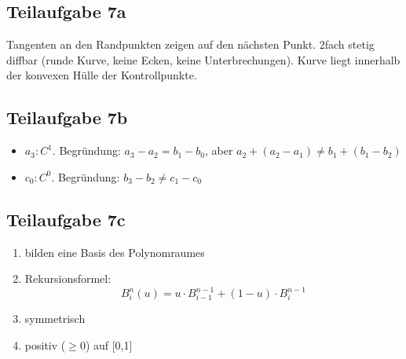 \documentclass[a4paper]{scrartcl}
\begin{document}
\subsection*{Teilaufgabe 7a}


Tangenten an den Randpunkten zeigen auf den nächsten Punkt. 2fach stetig diffbar (runde Kurve, keine Ecken, keine Unterbrechungen). Kurve liegt innerhalb der konvexen Hülle der Kontrollpunkte.

\subsection*{Teilaufgabe 7b}

\begin{itemize}
    \item $a_3: C^1$. Begründung: $a_3 - a_2 = b_1 - b_0$, aber $a_2 + (a_2-a_1) \neq b_1 + (b_1 - b_2)$
    \item $c_0: C^0$. Begründung: $b_3-b_2 \neq c_1 - c_0$
\end{itemize}

\subsection*{Teilaufgabe 7c}
\begin{enumerate}
    \item bilden eine Basis des Polynomraumes
    \item Rekursionsformel: \[B^n_i(u) = u \cdot B^{n-1}_{i-1} + (1-u) \cdot B^{n-1}_{i} \]
    \item symmetrisch
    \item positiv ($\geq 0$) auf [0,1]
\end{enumerate}
\end{document}
